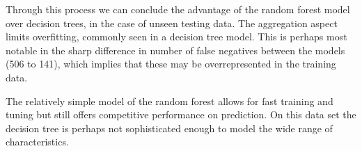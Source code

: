 \documentclass[11pt,a4paper]{article}
\newcommand\cincludegraphics[2][]{\raisebox{-0.3\height}{\texttt{[image: \#2]}}}
\begin{document}
\begin{figure}[h!]
  \centering
  \makebox[\textwidth][c]{
    \cincludegraphics[width=175mm]{./images/Figure_1.png}
  }
  \label{windowsize}
\end{figure}

Through this process we can conclude the advantage of the random forest model over decision trees, in the case of unseen testing data. The aggregation aspect limits overfitting, commonly seen in a decision tree model. This is perhaps most notable in the sharp difference in number of false negatives between the models (506 to 141), which implies that these may be overrepresented in the training data.

The relatively simple model of the random forest allows for fast training and tuning but still offers competitive performance on prediction. On this data set the decision tree is perhaps not sophisticated enough to model the wide range of characteristics.

\printbibliography[]
\end{document}
